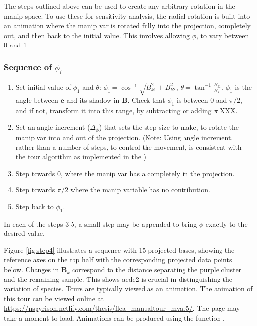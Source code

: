 The steps outlined above can be used to create any arbitrary rotation in
the manip space. To use these for sensitivity analysis, the radial
rotation is built into an animation where the manip var is rotated fully
into the projection, completely out, and then back to the initial value.
This involves allowing \(\phi\), to vary between 0 and 1.

\hypertarget{sequence-of-phi_i}{%
\subsubsection{\texorpdfstring{Sequence of
\(\phi_i\)}{Sequence of \textbackslash phi\_i}}\label{sequence-of-phi_i}}

\begin{enumerate}
\def\labelenumi{\arabic{enumi}.}
\tightlist
\item
  Set initial value of \(\phi_1\) and \(\theta\):
  \(\phi_1 = \cos^{-1}{\sqrt{B_{k1}^2+B_{k2}^2}}\),
  \(\theta=\tan^{-1}\frac{B_{k2}}{B_{k1}}\). \(\phi_1\) is the angle
  between \(\textbf{e}\) and its shadow in \(\textbf{B}\). Check that
  \(\phi_1\) is between 0 and \(\pi/2\), and if not, transform it into
  this range, by subtracting or adding \(\pi\) XXX.
\item
  Set an angle increment (\(\Delta_\phi\)) that sets the step size to
  make, to rotate the manip var into and out of the projection. (Note:
  Using angle increment, rather than a number of steps, to control the
  movement, is consistent with the tour algorithm as implemented in the
  ).
\item
  Step towards \(0\), where the manip var has a completely in the
  projection.
\item
  Step towards \(\pi/2\) where the manip variable has no contribution.
\item
  Step back to \(\phi_1\).
\end{enumerate}

In each of the steps 3-5, a small step may be appended to bring \(\phi\)
exactly to the desired value.

Figure \ref{fig:step4} illustrates a sequence with 15 projected bases,
showing the reference axes on the top half with the corresponding
projected data points below. Changes in \(\textbf{B}_k\) correspond to
the distance separating the purple cluster and the remaining sample.
This shows aede2 is crucial in distinguishing the variation of species.
Tours are typically viewed as an animation. The animation of this tour
can be viewed online at
\url{https://nspyrison.netlify.com/thesis/flea_manualtour_mvar5/}. The
page may take a moment to load. Animations can be produced using the
function .

